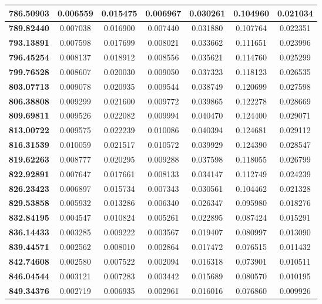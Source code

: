\documentclass[10pt, a4paper]{article}
\begin{document}
\begin{appendices}
\begin{longtable}{|c|c|c|c|c|c|c|}
	\textbf{786.50903} & 0.006559 & 0.015475 & 0.006967 & 0.030261 & 0.104960 & 0.021034 \\ \hline
	\textbf{789.82440} & 0.007038 & 0.016900 & 0.007440 & 0.031880 & 0.107764 & 0.022351 \\ \hline
	\textbf{793.13891} & 0.007598 & 0.017699 & 0.008021 & 0.033662 & 0.111651 & 0.023996 \\ \hline
	\textbf{796.45254} & 0.008137 & 0.018912 & 0.008556 & 0.035621 & 0.114760 & 0.025299 \\ \hline
	\textbf{799.76528} & 0.008607 & 0.020030 & 0.009050 & 0.037323 & 0.118123 & 0.026535 \\ \hline
	\textbf{803.07713} & 0.009078 & 0.020935 & 0.009544 & 0.038749 & 0.120699 & 0.027598 \\ \hline
	\textbf{806.38808} & 0.009299 & 0.021600 & 0.009772 & 0.039865 & 0.122278 & 0.028669 \\ \hline
	\textbf{809.69811} & 0.009526 & 0.022082 & 0.009994 & 0.040470 & 0.124400 & 0.029071 \\ \hline
	\textbf{813.00722} & 0.009575 & 0.022239 & 0.010086 & 0.040394 & 0.124681 & 0.029112 \\ \hline
	\textbf{816.31539} & 0.010059 & 0.021517 & 0.010572 & 0.039929 & 0.124390 & 0.028547 \\ \hline
	\textbf{819.62263} & 0.008777 & 0.020295 & 0.009288 & 0.037598 & 0.118055 & 0.026799 \\ \hline
	\textbf{822.92891} & 0.007647 & 0.017661 & 0.008133 & 0.034147 & 0.112749 & 0.024239 \\ \hline
	\textbf{826.23423} & 0.006897 & 0.015734 & 0.007343 & 0.030561 & 0.104462 & 0.021328 \\ \hline
	\textbf{829.53858} & 0.005932 & 0.013286 & 0.006340 & 0.026347 & 0.095980 & 0.018276 \\ \hline
	\textbf{832.84195} & 0.004547 & 0.010824 & 0.005261 & 0.022895 & 0.087424 & 0.015291 \\ \hline
	\textbf{836.14433} & 0.003285 & 0.009222 & 0.003567 & 0.019407 & 0.080997 & 0.013090 \\ \hline
	\textbf{839.44571} & 0.002562 & 0.008010 & 0.002864 & 0.017472 & 0.076515 & 0.011432 \\ \hline
	\textbf{842.74608} & 0.002580 & 0.007522 & 0.002094 & 0.016318 & 0.073901 & 0.010511 \\ \hline
	\textbf{846.04544} & 0.003121 & 0.007283 & 0.003442 & 0.015689 & 0.080570 & 0.010195 \\ \hline
	\textbf{849.34376} & 0.002719 & 0.006935 & 0.002961 & 0.016016 & 0.076860 & 0.009926 \\ \hline

\end{longtable}
\end{appendices}
\end{document}

